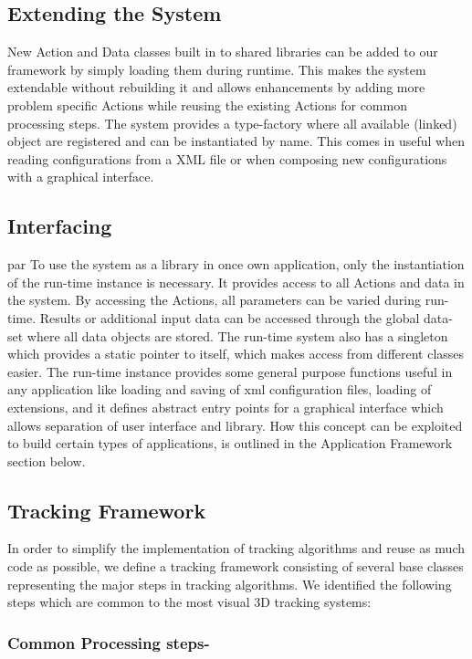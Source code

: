 \documentclass{article}
\begin{document}
\subsection{Extending the System }
\par New Action and Data classes built in to shared libraries can be added to our framework by simply loading them during runtime. This makes the system extendable without rebuilding it and allows enhancements by adding more problem speciﬁc Actions while reusing the existing Actions for common processing steps. The system provides a type-factory where all available (linked) object are registered and can be instantiated by name. This comes in useful when reading conﬁgurations from a XML ﬁle or when composing new conﬁgurations with a graphical interface.   

\subsection{Interfacing}
par To use the system as a library in once own application, only the instantiation of the run-time instance is necessary. It provides access to all Actions and data in the system. By accessing the Actions, all parameters can be varied during run-time. Results or additional input data can be accessed through the global data-set where all data objects are stored. The run-time system also has a singleton which provides a static pointer to itself, which makes access from different  classes easier. The run-time instance provides some general purpose functions useful in any application like loading and saving of xml conﬁguration ﬁles, loading of extensions, and it deﬁnes abstract entry points for a graphical interface which allows separation of user interface and library. How this concept can be exploited to build certain types of applications, is outlined in the Application Framework section below. 

\subsection{Tracking Framework}
\par In order to simplify the implementation of tracking algorithms and reuse as much code as possible, we deﬁne a tracking framework consisting of several base classes representing the major steps in tracking algorithms. We identiﬁed the following steps which are common to the most visual 3D tracking systems:
\subsubsection{Common Processing steps- }
\end{document}
